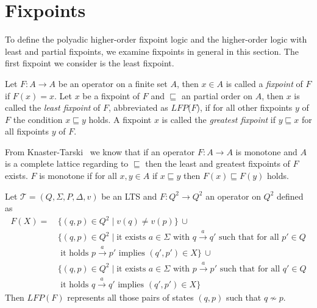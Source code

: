 
\section{Fixpoints}\label{sec:fixpoints}

To define the polyadic higher-order fixpoint logic and the higher-order logic with least and partial fixpoints, we examine fixpoints in general in this section. The first fixpoint we consider is the least fixpoint.

\begin{definition}
   Let $F\colon A \rightarrow A$ be an operator on a finite set $A$, then $x \in A$
   is called a \emph{fixpoint} of $F$ if $F(x) = x$. Let $x$ be a fixpoint of $F$ and $\sqsubseteq$ an partial order on $A$, then $x$ is called the \emph{least
   fixpoint} of $F$, abbreviated as $\mathit{LFP}$($F$), if for all other fixpoints $y$ of $F$ the condition $x
   \sqsubseteq y$ holds. A fixpoint $x$ is called the \emph{greatest fixpoint} if $y \sqsubseteq x$ for all fixpoints $y$ of $F$.
\end{definition}

From Knaster-Tarski~\cite{tarski1955lattice} we know that if an operator $F\colon A \rightarrow 
A$ is monotone and $A$ is a complete lattice regarding to $\sqsubseteq$ then the least and greatest fixpoints of $F$ exists. $F$ is monotone if for all $x, y
 \in A$ if $x \sqsubseteq y$ then $F(x) \sqsubseteq F(y)$ holds.

\begin{example}
    \label{example:lfp} Let $\mathcal{T} = (Q, \Sigma, P, \Delta, v)$ be an LTS and $F: Q^2 \rightarrow Q^2$ an operator on $Q^2$ defined as 
\begin{align*}
    F(X) =\, &\{(q, p) \in Q^2 \mid v(q) \neq v(p)\}\, \cup \\&
    \{(q,p) \in Q^2 \mid \text{it exists } a\in\Sigma \text{ with } q\overset{a}{\rightarrow} q' \text{ such that for all } p' \in Q \\&\text{ it holds } p\overset{a}{\rightarrow} p' \text{ implies } (q', p') \in X\}\,\cup \\&\{(q,p) \in Q^2 \mid  \text{it exists } a\in\Sigma \text{ with } p\overset{a}{\rightarrow} p' \text{ such that for all } q' \in Q \\&\text{ it holds } q\overset{a}{\rightarrow} q' \text{ implies } (q', p') \in X\}
\end{align*}   
Then $LFP(F)$ represents all those pairs of states $(q, p)$ such that $q\not\sim p$.
\end{example}


